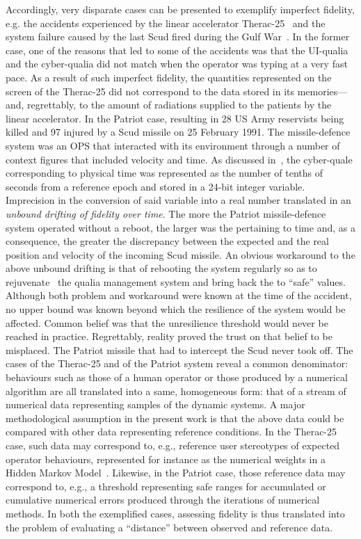 \documentclass{article}
\begin{document}
Accordingly, very disparate cases can be presented to exemplify imperfect fidelity, e.g. the accidents experienced by the linear accelerator Therac-25~\cite{Therac93,De10} and the system failure caused by the last Scud fired during the Gulf War~\cite{PatriotNYT}. In the former case, one of the reasons that led to some of the accidents was that the UI-qualia and the cyber-qualia did not match when the operator was typing at a very fast pace. As a result of such imperfect fidelity, the quantities represented on the screen of the Therac-25 did not correspond to the data stored in its memories---and, regrettably, to the amount of radiations supplied to the patients by the linear accelerator. In the Patriot case, resulting in 28 US Army reservists being killed and 97 injured by a Scud missile on 25 February 1991. The missile-defence system was an OPS that interacted with its environment through a number of context figures that included velocity and time. As discussed in~\cite{Assets:GrTr07}, the cyber-quale corresponding to physical time was represented as the number of tenths of seconds from a reference epoch and stored in a 24-bit integer variable. Imprecision in the conversion of said variable into a real number translated in an \emph{unbound drifting of fidelity over time}. The more the Patriot missile-defence system operated without a reboot, the larger was the  pertaining to time and, as a consequence, the greater the discrepancy between the expected and the real position and velocity of the incoming Scud missile.  An obvious workaround to the above unbound drifting is that of rebooting the system regularly so as to rejuvenate~\cite{GRT} the qualia management system and bring back the  to ``safe'' values. Although both problem and workaround were known at the time of the accident, no upper bound was known beyond which the resilience of the system would be affected. Common belief was that the unresilience threshold would never be reached in practice. Regrettably, reality proved the trust on that belief to be misplaced.
The Patriot missile that had to intercept the Scud never took off. The cases of the Therac-25 and of the Patriot system reveal a common denominator: behaviours such as those of a human operator or those produced by a numerical algorithm are all translated into a same, homogeneous form: that of a stream of numerical data
representing samples of the  dynamic systems. A major methodological assumption in the present work is that the above data could be compared with other data representing reference conditions. In the Therac-25 case, such data may correspond to, e.g., reference user stereotypes of expected operator behaviours, represented for instance as the numerical weights in a Hidden Markov Model~\cite{VD13}. Likewise, in the Patriot case, those reference data may correspond to, e.g.,
a threshold representing safe ranges for  accumulated or cumulative numerical errors produced through the iterations of numerical methods. In both the exemplified cases, assessing fidelity is thus translated into the problem of evaluating a ``distance'' between observed and reference data.
\end{document}
